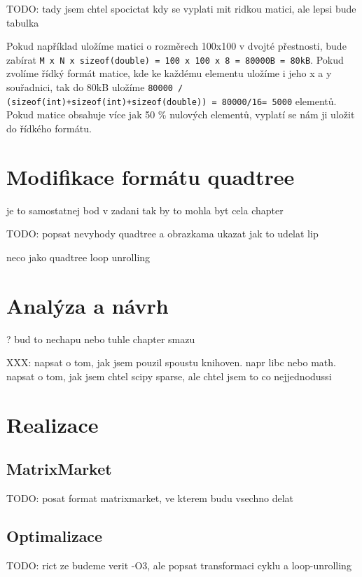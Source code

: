 \documentclass[thesis=B,czech]{FITthesis}[2012/06/26]
\begin{document}
TODO: tady jsem chtel spocictat kdy  se vyplati mit ridkou matici, ale lepsi bude tabulka

Pokud například uložíme matici o rozměrech 100x100 v dvojté přestnosti, bude zabírat \texttt{M x N x sizeof(double) = 100 x 100 x 8 = 80000B = 80kB}. Pokud zvolíme řídký formát matice, kde ke každému elementu uložíme i jeho x a y souřadnici, tak do 80kB uložíme \texttt{80000 / (sizeof(int)+sizeof(int)+sizeof(double)) = 80000/16= 5000} elementů. Pokud matice obsahuje více jak 50  \% nulových elementů, vyplatí se nám ji uložit do řídkého formátu.


\chapter{Modifikace formátu quadtree}

je to samostatnej bod v zadani tak by to mohla byt cela chapter

TODO: popsat nevyhody quadtree a obrazkama ukazat jak to udelat lip

neco jako quadtree loop unrolling


\chapter{Analýza a návrh}

? bud to nechapu nebo tuhle chapter smazu

XXX: napsat o tom, jak jsem pouzil spoustu knihoven. napr libc nebo math.
napsat o tom, jak jsem chtel scipy sparse, ale chtel jsem to co nejjednodussi

\chapter{Realizace}

\section{MatrixMarket}

TODO: posat format matrixmarket, ve kterem budu vsechno delat

\section{Optimalizace}

TODO: rict ze budeme verit -O3, ale popsat transformaci cyklu a loop-unrolling
\end{document}
